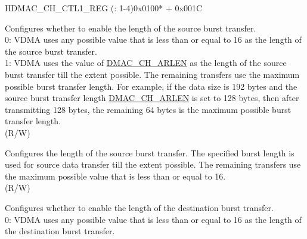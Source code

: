 \begin{register}{H}{DMAC\_CH\_CTL1\_REG (: 1-4)}{0x0100* + 0x001C}\label{regdesc:DMACCHNCTL1REG}
%
%
%
%
%
%
%
%
%
%
%
\regnewline%

\begin{regdesc}\begin{reglist}
\label{fielddesc:DMACCHNARLENEN}\item [DMAC\_CH\regindex{n}\_ARLEN\_EN] Configures whether to enable the length of the source burst transfer. \\
0: VDMA uses any possible value that is less than or equal to 16 as the length of the source burst transfer.\\
1: VDMA uses the value of \hyperref[fielddesc:DMACCHNARLEN]{DMAC\_CH\_ARLEN} as the length of the source burst transfer till the extent possible. The remaining transfers use the maximum possible burst transfer length. For example, if the data size is 192 bytes and the source burst transfer length \hyperref[fielddesc:DMACCHNARLEN]{DMAC\_CH\_ARLEN} is set to 128 bytes, then after transmitting 128 bytes, the remaining 64 bytes is the maximum possible burst transfer length.\\ 
(R/W)
\label{fielddesc:DMACCHNARLEN}\item [DMAC\_CH\regindex{n}\_ARLEN] Configures the length of the source burst transfer. The specified burst length is used for source data transfer till the extent possible. The remaining transfers use the maximum possible value that is less than or equal to 16.\\
(R/W)
\label{fielddesc:DMACCHNAWLENEN}\item [DMAC\_CH\regindex{n}\_AWLEN\_EN] Configures whether to enable the length of the destination burst transfer. \\
0: VDMA uses any possible value that is less than or equal to 16 as the length of the destination burst transfer.\\

\end{reglist}
\end{regdesc}
\end{register}
